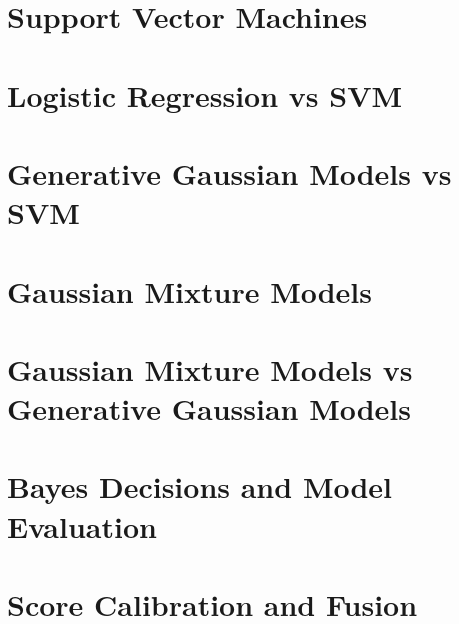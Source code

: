\documentclass[a4paper,12pt]{article}
\begin{document}
\section{Support Vector Machines}


\section{Logistic Regression vs SVM}


\section{Generative Gaussian Models vs SVM}


\section{Gaussian Mixture Models}


\section{Gaussian Mixture Models vs Generative Gaussian Models}


\section{Bayes Decisions and Model Evaluation}


\section{Score Calibration and Fusion}


\end{document}
